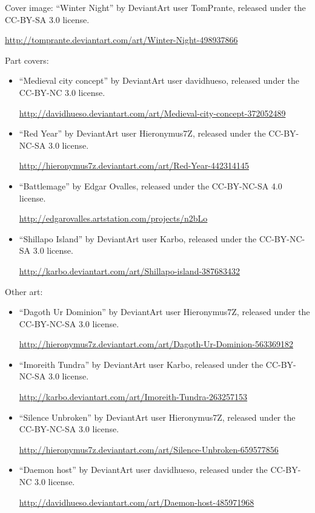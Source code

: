 \item Cover image: ``Winter Night'' by DeviantArt user TomPrante,
  released under the CC-BY-SA 3.0 license.

  \url{http://tomprante.deviantart.com/art/Winter-Night-498937866}

\item Part covers: \begin{itemize}

\item ``Medieval city concept'' by DeviantArt user davidhueso, released under the CC-BY-NC 3.0 license.

  \url{http://davidhueso.deviantart.com/art/Medieval-city-concept-372052489}

\item ``Red Year'' by DeviantArt user Hieronymus7Z, released under the CC-BY-NC-SA 3.0 license.

  \url{http://hieronymus7z.deviantart.com/art/Red-Year-442314145}

\item ``Battlemage'' by Edgar Ovalles, released under the CC-BY-NC-SA 4.0 license.

  \url{http://edgarovalles.artstation.com/projects/n2bLo}

\item ``Shillapo Island'' by DeviantArt user Karbo, released under the CC-BY-NC-SA 3.0 license.

  \url{http://karbo.deviantart.com/art/Shillapo-island-387683432}

\end{itemize}

\item Other art: \begin{itemize}

\item ``Dagoth Ur Dominion'' by DeviantArt user Hieronymus7Z, released under the CC-BY-NC-SA 3.0 license.

  \url{http://hieronymus7z.deviantart.com/art/Dagoth-Ur-Dominion-563369182}

\item ``Imoreith Tundra'' by DeviantArt user Karbo, released under the CC-BY-NC-SA 3.0 license.

  \url{http://karbo.deviantart.com/art/Imoreith-Tundra-263257153}

\item ``Silence Unbroken'' by DeviantArt user Hieronymus7Z, released under the CC-BY-NC-SA 3.0 license.

  \url{http://hieronymus7z.deviantart.com/art/Silence-Unbroken-659577856}

\item ``Daemon host'' by DeviantArt user davidhueso, released under the CC-BY-NC 3.0 license.

  \url{http://davidhueso.deviantart.com/art/Daemon-host-485971968}

\end{itemize}
